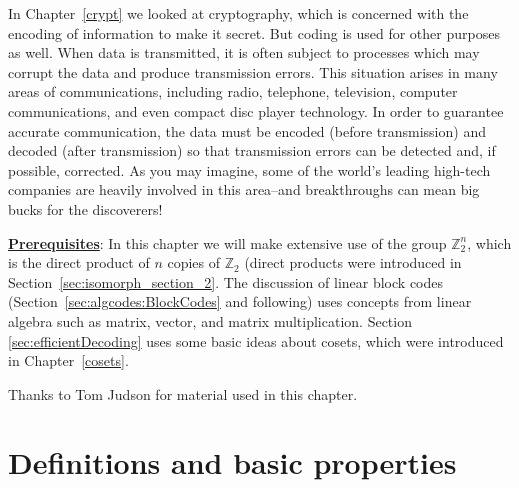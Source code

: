  
In Chapter~\ref{crypt} we looked at  cryptography, which is concerned with the encoding of  information to make it secret. But coding is used for other purposes as well.  When data is transmitted, it is often subject to processes which may corrupt the data and produce transmission errors. This situation
arises in many areas of communications, including radio, telephone, television, computer communications, and even compact disc player technology. In order to guarantee accurate communication, the data must be encoded (before transmission) and decoded (after transmission) so that transmission errors can be detected and, if possible, corrected. As you may imagine,  some of the world's leading high-tech companies are heavily involved in this area--and breakthroughs can mean big bucks for the discoverers!
\medskip

\noindent
\underline{\bf Prerequisites}: In this chapter we will make extensive use of the group $\mathbb{Z}^{n}_{2}$, which is the direct product of $n$ copies of $\mathbb{Z}_{2}$ (direct products were introduced in Section~\ref{sec:isomorph_section_2}.  
The discussion of linear block codes (Section~\ref{sec:algcodes:BlockCodes} and following) uses concepts from linear algebra such as matrix, vector, and matrix multiplication. Section \ref{sec:efficientDecoding} uses some basic ideas about cosets, which were introduced in  Chapter~\ref{cosets}.  
\bigskip

Thanks to Tom Judson for material used in this chapter.
  
 
\section{Definitions and basic properties}
\label{sec:ErrorAndCorrectionCode:Definitions}
  
